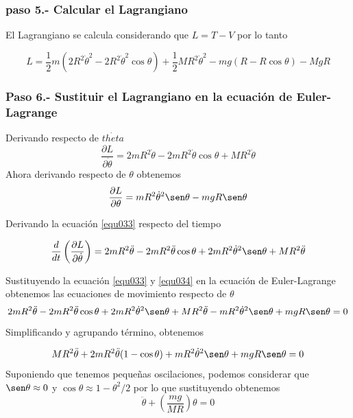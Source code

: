 \documentclass[12pt]{book}
\theoremstyle{definition}
\theoremstyle{remark}
\theoremstyle{plain}
\begin{document}
\subsubsection{paso 5.- Calcular el Lagrangiano}

El Lagrangiano se calcula considerando que $L=T-V$ por lo tanto

\begin{equation}
\label{equ031}
L =  \frac{1}{2} m (2  R^2 \dot{\theta}^2- 2 R^2 \dot{\theta}^2 \cos \theta )+\frac{1}{2} M R ^2 \dot{\theta}^2 - m g (R- R \cos \theta) -  M g R
\end{equation}

\subsubsection{Paso 6.- Sustituir el Lagrangiano en la ecuación de Euler-Lagrange}

Derivando respecto de $\dot{theta}$
\begin{equation}
\label{equ032}
\frac{\partial L}{\partial \dot{\theta}}= 2 m R^2 \dot{\theta}-2 m R^2 \dot{\theta} \cos \theta+ M R^2 \dot{\theta} 
\end{equation}
Ahora derivando respecto de $\theta$ obtenemos
\begin{equation}
\label{equ033}
\frac{\partial L}{\partial \theta}= m R^2 \dot{\theta}^2 \sen \theta- m g R \sen \theta 
\end{equation}


Derivando la ecuación \ref{equ033} respecto del tiempo

\begin{equation}
\label{equ034}
\frac{d}{d t} \left ( \frac{\partial L}{\partial \dot{\theta}}\right )= 2 m R^2 \ddot{\theta}-2 m R^2 \ddot{\theta} \cos \theta+2 m R^2 \dot{\theta}^2 \sen \theta+ M R^2 \ddot{\theta} 
\end{equation}
 
Sustituyendo la ecuación \ref{equ033} y \ref{equ034} en la ecuación de Euler-Lagrange obtenemos las ecuaciones de movimiento respecto de $\theta$
\begin{equation*}
2 m R^2 \ddot{\theta}-2 m R^2 \ddot{\theta} \cos \theta+2 m R^2 \dot{\theta}^2 \sen \theta+ M R^2 \ddot{\theta}-m R^2 \dot{\theta}^2 \sen \theta+ m g R \sen \theta =0
\end{equation*}
Simplificando y agrupando término,  obtenemos

\begin{equation}
\label{equ035}
M R^2 \ddot{\theta}+ 2 m R^2 \ddot{\theta}(1-\cos \theta)+ m R^2 \dot{\theta}^2 \sen \theta+  m g R \sen \theta =0
\end{equation}
Suponiendo que tenemos pequeñas oscilaciones, podemos considerar que $\sen \theta \approx 0$ y $\cos \theta \approx 1 - \theta ^2/2$ por lo que sustituyendo obtenemos
\begin{equation}
\label{equ036}
\ddot{\theta} + \left ( \frac{m g}{M R} \right ) \theta =0
\end{equation}
\end{document}
